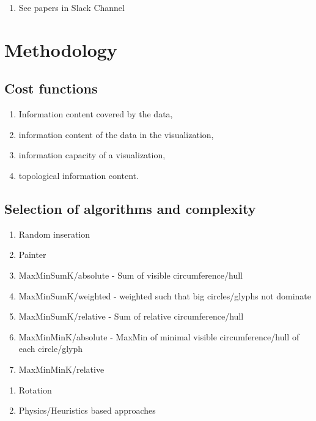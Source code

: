 \documentclass[a4paper,11pt]{article}
\theoremstyle{mytheor}
\begin{document}
\begin{enumerate}
    \item See papers in Slack Channel
\end{enumerate}

\newpage
\section{Methodology}

\subsection{Cost functions}

\begin{enumerate}
    \item Information content covered by the data,
    \item information content of the data in the visualization,
    \item information capacity of a visualization,
    \item topological information content.
\end{enumerate}



\subsection{Selection of algorithms and complexity}

\begin{enumerate}
    \item Random inseration
    \item Painter
    \item MaxMinSumK/absolute - Sum of visible circumference/hull
    \item MaxMinSumK/weighted - weighted such that big circles/glyphs not dominate
    \item MaxMinSumK/relative - Sum of relative circumference/hull
    \item MaxMinMinK/absolute - MaxMin of minimal visible circumference/hull of each circle/glyph
    \item MaxMinMinK/relative
\end{enumerate}

\begin{enumerate}
    \item Rotation
    \item Physics/Heuristics based approaches
\end{enumerate}
\end{document}
